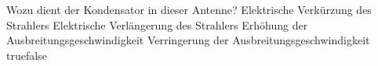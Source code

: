     {Wozu dient der Kondensator in dieser Antenne?}
    {Elektrische Verkürzung des Strahlers}
    {Elektrische Verlängerung des Strahlers}
    {Erhöhung der Ausbreitungsgeschwindigkeit}
    {Verringerung der Ausbreitungsgeschwindigkeit}
    {true}{false}